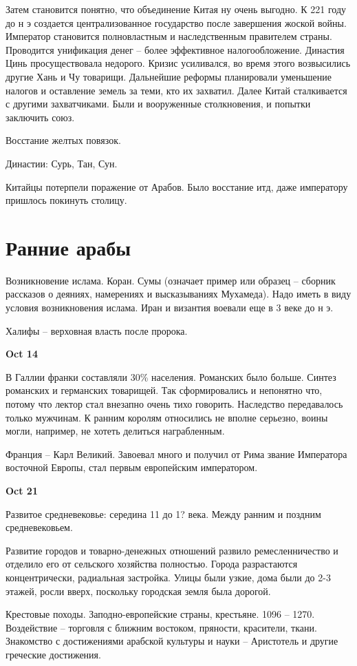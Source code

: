 \documentclass[a4paper, 12pt]{article}
\def\dateis#1{\vspace{\baselineskip}\hfill\textbf{#1}\par}
\begin{document}
\begin{multicols}{2}
Затем становится понятно, что объединение Китая ну очень выгодно. К 221 году до н э создается централизованное государство после завершения жоской войны. Император становится полновластным и наследственным правителем страны. Проводится унификация денег -- более эффективное налогообложение. Династия Цинь просуществовала недорого. Кризис усиливался, во время этого возвысились другие Хань и Чу товарищи. Дальнейшие реформы планировали уменьшение налогов и оставление земель за теми, кто их захватил. Далее Китай сталкивается с другими захватчиками. Были и вооруженные столкновения, и попытки заключить союз.

Восстание желтых повязок. 

Династии: Сурь, Тан, Сун. 

Китайцы потерпели поражение от Арабов. Было восстание итд, даже императору пришлось покинуть столицу. 


\section{Ранние арабы}
Возникновение ислама. Коран. Сумы (означает пример или образец -- сборник рассказов о деяниях, намерениях и высказываниях Мухамеда). Надо иметь в виду условия возникновения ислама. Иран и византия воевали еще в 3 веке до н э. 

Халифы -- верховная власть после пророка.

\dateis{Oct 14}
В Галлии франки составляли 30\% населения. Романских было больше. Синтез романских и германских товарищей. Так сформировались и непонятно что, потому что лектор стал внезапно очень тихо говорить. Наследство передавалось только мужчинам. К ранним королям относились не вполне серьезно, воины могли, например, не хотеть делиться награбленным. 

Франция -- Карл Великий. Завоевал много и получил от Рима звание Императора восточной Европы, стал первым европейским императором. 

\dateis{Oct 21}
Развитое средневековье: середина 11 до 1? века. Между ранним и поздним средневековьем. 

Развитие городов и товарно-денежных отношений развило ремесленничество и отделило его от сельского хозяйства полностью. Города разрастаются концентрически, радиальная застройка. Улицы были узкие, дома были до 2-3 этажей, росли вверх, поскольку городская земля была дорогой. 

Крестовые походы. Заподно-европейские страны, крестьяне. 1096 -- 1270. Воздействие -- торговля с ближним востоком, пряности, красители, ткани. Знакомство с достижениями арабской культуры и науки -- Аристотель и другие греческие достижения. 


\end{multicols}
\end{document}
